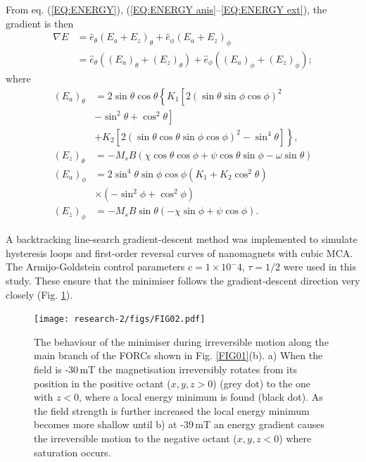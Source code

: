 From eq. (\ref{EQ:ENERGY}), (\ref{EQ:ENERGY anis}--\ref{EQ:ENERGY ext}), the gradient is then
\begin{align}
  \nabla E &= \hat{e}_\theta \left( E_a + E_z \right)_\theta + \hat{e}_\phi \left( E_a + E_z \right)_\phi  \nonumber \\
           &= \hat{e}_\theta \left( (E_a)_\theta + (E_z)_\theta \right) + \hat{e}_\phi \left( (E_a)_\phi + (E_z)_\phi \right);
\end{align}
where
\begin{align}
( E_a )_\theta &= 2\sin\theta\cos\theta\left\{ K_1  \left[ 2\left( \sin\theta\sin\phi\cos\phi \right)^2 \right. \right. \nonumber \\
             &- \left. \sin^2 \theta + \cos^2 \theta \right] \nonumber \\
             &+ \left. K_2 \left[ 2( \sin\theta\cos\theta\sin\phi\cos\phi )^2 - \sin^4\theta \right] \right\}, \\
( E_z )_\theta &= - M_s B ( \chi\cos\theta\cos\phi + \psi\cos\theta\sin\phi - \omega\sin\theta ) \\
( E_a )_\phi &= 2\sin^4\theta\sin\phi\cos\phi \left( K_1+K_2\cos^2\theta\right) \nonumber \\
            &\times \left( - \sin^2\phi + \cos^2\phi \right) \\
( E_z )_\phi &= -M_s B\sin\theta \left( - \chi\sin\phi + \psi\cos\phi \right).
\end{align}
\par
A backtracking line-search gradient-descent method \citep{Armijo1966} was implemented to simulate hysteresis loops and first-order reversal curves of nanomagnets with cubic MCA. The Armijo-Goldstein control parameters $c=1\times10^-4$, $\tau=1/2$ were used in this study. These ensure that the minimiser follows the gradient-descent direction very closely (Fig. \ref{FIG02}).
\begin{figure}
\texttt{[image: research-2/figs/FIG02.pdf]}
\caption[The behaviour of the minimiser during irreversible motion]{The behaviour of the minimiser during irreversible motion along the main branch of the FORCs shown in Fig. \ref{FIG01}(b). a) When the field is -30$\,$mT the magnetisation irreversibly rotates from its position in the positive octant ($x,y,z>0$) (grey dot) to the one with $z<0$, where a local energy minimum is found (black dot). As the field strength is further increased the local energy minimum becomes more shallow until b) at -39$\,$mT an energy gradient causes the irreversible motion to the negative octant ($x,y,z<0$) where saturation occurs.}
\label{FIG02}
\end{figure}
\par

